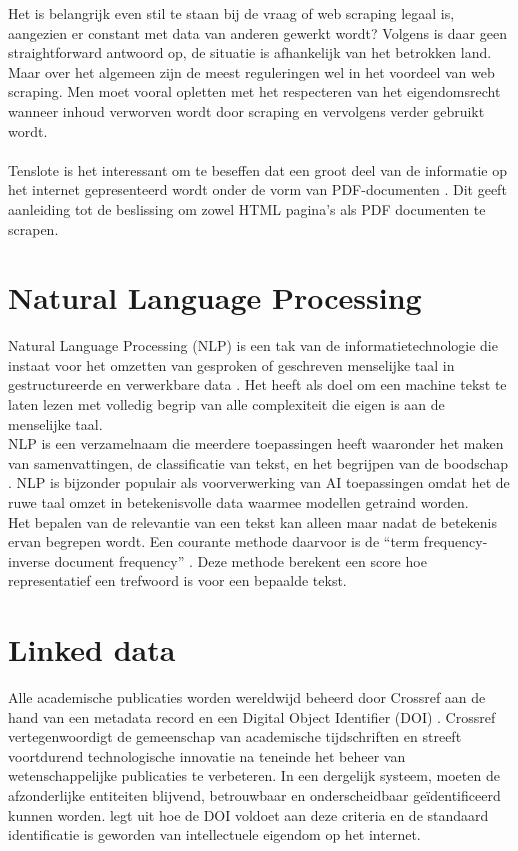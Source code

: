 Het is belangrijk even stil te staan bij de vraag of web scraping legaal is, aangezien er constant met data van anderen gewerkt wordt? Volgens \textcite{EPSI2015} is daar geen straightforward antwoord op, de situatie is afhankelijk van het betrokken land. Maar over het algemeen zijn de meest reguleringen wel in het voordeel van web scraping. Men moet vooral opletten met het respecteren van het eigendomsrecht wanneer inhoud verworven wordt door scraping en vervolgens verder gebruikt wordt.\\\\
Tenslote is het interessant om te beseffen dat een groot deel van de informatie op het internet gepresenteerd wordt onder de vorm van PDF-documenten \autocite{Singrodia2019}. Dit geeft aanleiding tot de beslissing om zowel HTML pagina's als PDF documenten te scrapen.\\
\section{Natural Language Processing}
Natural Language Processing (NLP) is een tak van de informatietechnologie die instaat voor het omzetten van gesproken of geschreven menselijke taal in gestructureerde en verwerkbare data \autocite{Fanni2023}.
Het heeft als doel om een machine tekst te laten lezen met volledig begrip van alle complexiteit die eigen is aan de menselijke taal.\\
NLP is een verzamelnaam die meerdere toepassingen heeft waaronder het maken van samenvattingen, de classificatie van tekst, en het begrijpen van de boodschap \autocite{Khurana2022}. NLP is bijzonder populair als voorverwerking van AI toepassingen omdat het de ruwe taal omzet in betekenisvolle data waarmee modellen getraind worden.\\
Het bepalen van de relevantie van een tekst kan alleen maar nadat de betekenis ervan begrepen wordt. Een courante methode daarvoor is de ``term frequency-inverse document frequency'' \autocite{Havrlant2017}. Deze methode berekent een score hoe representatief een trefwoord is voor een bepaalde tekst. 
\section{Linked data}
Alle academische publicaties worden wereldwijd beheerd door Crossref aan de hand van een metadata record en een Digital Object Identifier (DOI) \autocite{Hendricks2020}. Crossref vertegenwoordigt de gemeenschap van academische tijdschriften en streeft voortdurend technologische innovatie na teneinde het beheer van wetenschappelijke publicaties te verbeteren.
In een dergelijk systeem, moeten de afzonderlijke entiteiten blijvend, betrouwbaar en onderscheidbaar geïdentificeerd kunnen worden. \textcite{Chandrakar2006} legt uit hoe de DOI voldoet aan deze criteria en de standaard identificatie is geworden van intellectuele eigendom op het internet.
